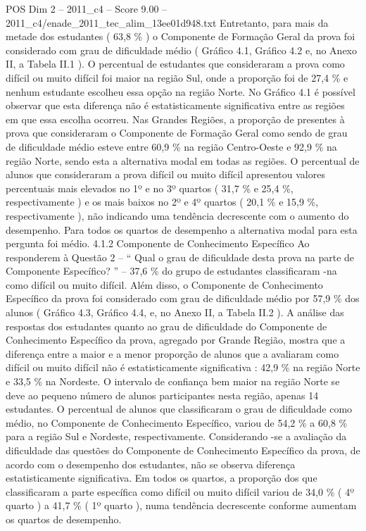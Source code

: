 \begin{textsample}{POS Dim 2 – 2011\_c4 – Score 9.00 – 2011\_c4/enade\_2011\_tec\_alim\_13ee01d948.txt}
Entretanto, para mais da metade dos estudantes ( 63,8 \% ) o Componente de Formação Geral da prova foi considerado com grau de dificuldade médio ( Gráfico 4.1, Gráfico 4.2 e, no Anexo II, a Tabela II.1 ).
O percentual de estudantes que consideraram a prova como difícil ou muito difícil foi maior na região Sul, onde a proporção foi de 27,4 \% e nenhum estudante escolheu essa opção na região Norte.
No Gráfico 4.1 é possível observar que esta diferença não é estatisticamente significativa entre as regiões em que essa escolha ocorreu.
Nas Grandes Regiões, a proporção de presentes à prova que consideraram o Componente de Formação Geral como sendo de grau de dificuldade médio esteve entre 60,9 \% na região Centro-Oeste e 92,9 \% na região Norte, sendo esta a alternativa modal em todas as regiões.
O percentual de alunos que consideraram a prova difícil ou muito difícil apresentou valores percentuais mais elevados no 1º e no 3º quartos ( 31,7 \% e 25,4 \%, respectivamente ) e os mais baixos no 2º e 4º quartos ( 20,1 \% e 15,9 \%, respectivamente ), não indicando uma tendência decrescente com o aumento do desempenho.
Para todos os quartos de desempenho a alternativa modal para esta pergunta foi médio. 4.1.2 Componente de Conhecimento Específico Ao responderem à Questão 2 – “ Qual o grau de dificuldade desta prova na parte de Componente Específico? ” – 37,6 \% do grupo de estudantes classificaram -na como difícil ou muito difícil.
Além disso, o Componente de Conhecimento Específico da prova foi considerado com grau de dificuldade médio por 57,9 \% dos alunos ( Gráfico 4.3, Gráfico 4.4, e, no Anexo II, a Tabela II.2 ).
A análise das respostas dos estudantes quanto ao grau de dificuldade do Componente de Conhecimento Específico da prova, agregado por Grande Região, mostra que a diferença entre a maior e a menor proporção de alunos que a avaliaram como difícil ou muito difícil não é estatisticamente significativa : 42,9 \% na região Norte e 33,5 \% na Nordeste.
O intervalo de confiança bem maior na região Norte se deve ao pequeno número de alunos participantes nesta região, apenas 14 estudantes.
O percentual de alunos que classificaram o grau de dificuldade como médio, no Componente de Conhecimento Específico, variou de 54,2 \% a 60,8 \% para a região Sul e Nordeste, respectivamente.
Considerando -se a avaliação da dificuldade das questões do Componente de Conhecimento Específico da prova, de acordo com o desempenho dos estudantes, não se observa diferença estatisticamente significativa.
Em todos os quartos, a proporção dos que classificaram a parte específica como difícil ou muito difícil variou de 34,0 \% ( 4º quarto ) a 41,7 \% ( 1º quarto ), numa tendência decrescente conforme aumentam os quartos de desempenho.

\end{textsample}
